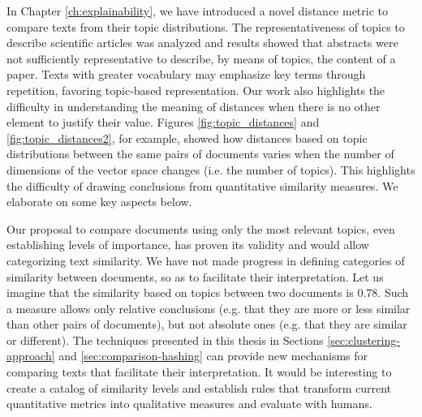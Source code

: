 In Chapter \ref{ch:explainability}, we have introduced a novel distance metric to compare texts from their topic distributions. The representativeness of topics to describe scientific articles was analyzed and results showed that abstracts were not sufficiently representative to describe, by means of topics, the content of a paper. Texts with greater vocabulary may emphasize key terms through repetition, favoring topic-based representation. Our work also highlights the difficulty in understanding the meaning of distances when there is no other element to justify their value. Figures \ref{fig:topic_distances} and \ref{fig:topic_distances2}, for example, showed how distances based on topic distributions between the same pairs of documents varies when the number of dimensions of the vector space changes (i.e. the number of topics). This highlights the difficulty of drawing conclusions from quantitative similarity measures. We elaborate on some key aspects below.

Our proposal to compare documents using only the most relevant topics, even establishing levels of importance, has proven its validity and would allow categorizing text similarity. We have not made progress in defining categories of similarity between documents, so as to facilitate their interpretation. Let us imagine that the similarity based on topics between two documents is 0.78. Such a measure allows only relative conclusions (e.g. that they are more or less similar than other pairs of documents), but not absolute ones (e.g. that they are similar or different). The techniques presented in this thesis in Sections \ref{sec:clustering-approach} and \ref{sec:comparison-hashing} can provide new mechanisms for comparing texts that facilitate their interpretation. It would be interesting to create a catalog of similarity levels and establish rules that transform current quantitative metrics into qualitative measures and evaluate with humans.
  
